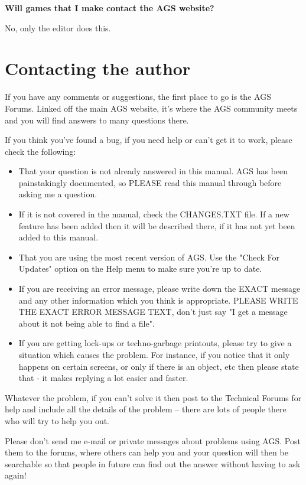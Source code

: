 \bf{Will games that I make contact the AGS website?}

No, only the editor does this.



\chapter{Contacting the author}%

If you have any comments or suggestions, the first place to go is the AGS
Forums. Linked off the main AGS website, it's where the AGS community
meets and you will find answers to many questions there.

If you think you've found a bug, if you need help or can't get it to work,
please check the following:\begin{itemize}
\item That your question is not already answered in this manual. AGS has been
painstakingly documented, so PLEASE read this manual through before asking
me a question.
\item If it is not covered in the manual, check the CHANGES.TXT file. If a new
feature has been added then it will be described there, if it has not yet
been added to this manual.
\item That you are using the most recent version of AGS. Use the "Check For
Updates" option on the Help menu to make sure you're up to date.
\item If you are receiving an error message, please write down the EXACT message
and any other information which you think is appropriate. PLEASE WRITE THE
EXACT ERROR MESSAGE TEXT, don't just say "I get a message about it not being
able to find a file".
\item If you are getting lock-ups or techno-garbage printouts, please try to
give a situation which causes the problem. For instance, if you notice that
it only happens on certain screens, or only if there is an object, etc then
please state that - it makes replying a lot easier and faster.
\end{itemize}
Whatever the problem, if you can't solve it then post to the Technical Forums
for help and include all the details of the problem -- there are lots of
people there who will try to help you out.

Please don't send me e-mail or private messages about problems using AGS.
Post them to the forums, where others can help you and your question will
then be searchable so that people in future can find out the answer without
having to ask again!

